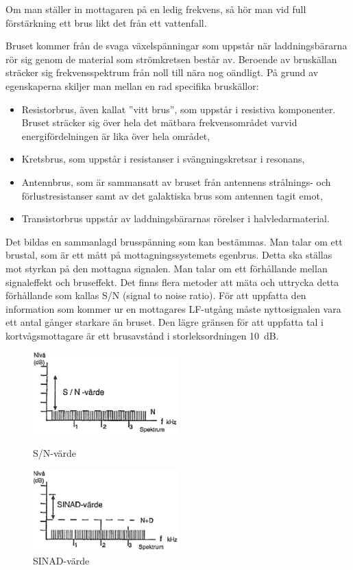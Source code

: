 Om man ställer in mottagaren på en ledig frekvens, så hör man vid full
förstärkning ett brus likt det från ett vattenfall.

Bruset kommer från de svaga växelspänningar som uppstår när
laddningsbärarna rör sig genom de material som strömkretsen består
av. Beroende av bruskällan sträcker sig frekvensspektrum från noll
till nära nog oändligt. På grund av egenskaperna skiljer man mellan en
rad specifika bruskällor:
\begin{itemize}
\item Resistorbrus, även kallat ''vitt brus'', som uppstår i resistiva
  komponenter. Bruset sträcker sig över hela det mätbara
  frekvensområdet varvid energifördelningen är lika över hela området,

\item Kretsbrus, som uppstår i resistanser i svängningskretsar i
  resonans,

\item Antennbrus, som är sammansatt av bruset från antennens
  strålnings- och förlustresistanser samt av det galaktiska brus som
  antennen tagit emot,

\item Transistorbrus uppstår av laddningsbärarnas rörelser i
  halvledarmaterial.
\end{itemize}

Det bildas en sammanlagd brusspänning som kan bestämmas. Man talar om
ett brustal, som är ett mått på mottagningssystemets egenbrus. Detta
ska ställas mot styrkan på den mottagna signalen. Man talar om ett
förhållande mellan signaleffekt och bruseffekt. Det finns flera
metoder att mäta och uttrycka detta förhållande som kallas S/N (signal
to noise ratio). För att uppfatta den information som kommer ur en
mottagares LF-utgång måste nyttosignalen vara ett antal gånger
starkare än bruset. Den lägre gränsen för att uppfatta tal i
kortvågsmottagare är ett brusavstånd i storleksordningen 10~dB.

\begin{figure}
  \includegraphics[width=0.5\textwidth]{images/cropped_pdfs/bild_2_4-29.pdf}
  \caption{S/N-värde}
  \label{fig:bildII4-29}

  \includegraphics[width=0.5\textwidth]{images/cropped_pdfs/bild_2_4-30.pdf}
  \caption{SINAD-värde}
  \label{fig:bildII4-30}
\end{figure}

